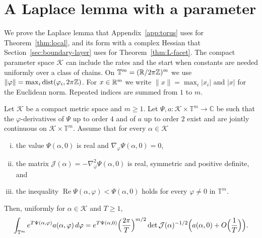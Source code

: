 \section{A Laplace lemma with a parameter}\label{app:laplace}

We prove the Laplace lemma that Appendix~\ref{app:torus} uses for
Theorem~\ref{thm:local}, and its form with a complex Hessian that
Section~\ref{sec:boundary-layer} uses for Theorem~\ref{thm:L-facet}. The compact
parameter space $\mathcal K$ can include the rates and the start when constants are
needed uniformly over a class of chains. On $\mathbb T^m=(\mathbb{R}/2\pi\mathbb{Z})^m$ we use
$\lVert\varphi\rVert=\max_i\operatorname{dist}(\varphi_i,2\pi\mathbb{Z})$. For
$x\in\mathbb{R}^m$ we write $\lVert x\rVert=\max_i|x_i|$ and $|x|$ for the Euclidean
norm. Repeated indices are summed from $1$ to $m$.

\begin{lemma}\label{lem:laplace}
Let $\mathcal K$ be a compact metric space and $m\ge1$. Let
$\Psi,a:\mathcal K\times\mathbb T^m\to\mathbb C$ be such that the
$\varphi$-derivatives of $\Psi$ up to order $4$ and of $a$ up to order $2$
exist and are jointly continuous on $\mathcal K\times\mathbb T^m$. Assume that
for every $\alpha\in\mathcal K$
\begin{enumerate}[(i)]
\item the value $\Psi(\alpha,0)$ is real and $\nabla_\varphi\Psi(\alpha,0)=0$,
\item the matrix $\mathcal J(\alpha)=-\nabla^2_\varphi\Psi(\alpha,0)$ is real, symmetric
and positive definite, and
\item the inequality $\operatorname{Re}\Psi(\alpha,\varphi)<\Psi(\alpha,0)$ holds for every
$\varphi\ne0$ in $\mathbb T^m$.
\end{enumerate}
Then, uniformly for $\alpha\in\mathcal K$ and $T\ge1$,
\[
\int_{\mathbb T^m}e^{T\Psi(\alpha,\varphi)}a(\alpha,\varphi)\,d\varphi
=e^{T\Psi(\alpha,0)}\Bigl(\frac{2\pi}T\Bigr)^{m/2}\det\mathcal J(\alpha)^{-1/2}
\Bigl(a(\alpha,0)+O\Bigl(\frac1T\Bigr)\Bigr).
\]
\end{lemma}

